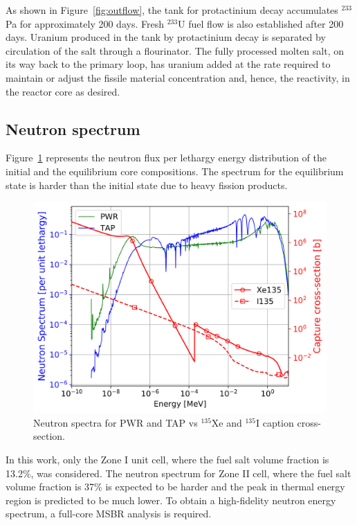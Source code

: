 \documentclass{anstrans}
\begin{document}
As shown in Figure~\ref{fig:outflow}, the tank for protactinium decay 
accumulates $^{233}$Pa for approximately 200 days. Fresh $^{233}$U fuel flow is 
also established after 200 days. Uranium produced in the tank by protactinium 
decay is separated by circulation of the salt through a flourinator. The fully 
processed molten salt, on its way back to the primary loop, has uranium added 
at the rate required to maintain or adjust the fissile material concentration 
and, hence, the reactivity, in the reactor core as desired.

\subsection{Neutron spectrum}

Figure~\ref{fig:spectrum} represents the neutron flux per lethargy energy distribution 
of the initial and the equilibrium core compositions. The spectrum for the 
equilibrium state is harder than the initial state due to heavy fission 
products.  
\begin{figure}[htbp!] %
        \centering
        \includegraphics[width=1.05\linewidth]{spectra.png}
        \caption{Neutron spectra for PWR and TAP vs $^{135}$Xe and $^{135}$I 
        caption cross-section.}
        \label{fig:spectrum}
\end{figure}

\FloatBarrier 

In this work, only the Zone I unit cell, where the fuel salt volume fraction is 
13.2\%, was considered. The neutron spectrum for Zone II cell, where the fuel 
salt volume fraction is 37\% is expected to be harder and the peak in thermal 
energy region is predicted to be much 
lower. To obtain a high-fidelity neutron energy spectrum, a full-core \gls{MSBR}
analysis is required.
\end{document}
